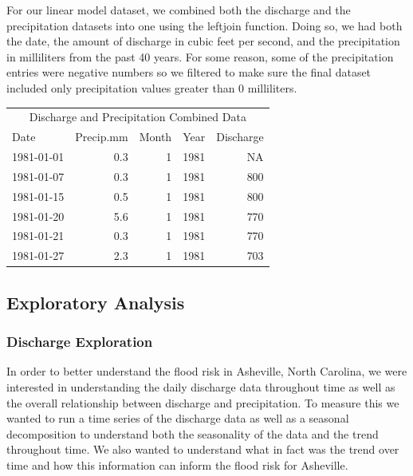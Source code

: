 \documentclass[
]{article}
\begin{document}
For our linear model dataset, we combined both the discharge and the
precipitation datasets into one using the leftjoin function. Doing so,
we had both the date, the amount of discharge in cubic feet per second,
and the precipitation in milliliters from the past 40 years. For some
reason, some of the precipitation entries were negative numbers so we
filtered to make sure the final dataset included only precipitation
values greater than 0 milliliters.

\begin{table}
\centering
\begin{tabular}[t]{l|r|r|r|r}
\hline
\multicolumn{5}{c}{Discharge and Precipitation Combined Data} \\
\cline{1-5}
Date & Precip.mm & Month & Year & Discharge\\
\hline
1981-01-01 & 0.3 & 1 & 1981 & NA\\
\hline
1981-01-07 & 0.3 & 1 & 1981 & 800\\
\hline
1981-01-15 & 0.5 & 1 & 1981 & 800\\
\hline
1981-01-20 & 5.6 & 1 & 1981 & 770\\
\hline
1981-01-21 & 0.3 & 1 & 1981 & 770\\
\hline
1981-01-27 & 2.3 & 1 & 1981 & 703\\
\hline
\end{tabular}
\end{table}

\newpage

\hypertarget{exploratory-analysis}{%
\subsection{\texorpdfstring{\textbf{Exploratory
Analysis}}{Exploratory Analysis}}\label{exploratory-analysis}}

\hypertarget{discharge-exploration}{%
\subsubsection{\texorpdfstring{\textbf{Discharge
Exploration}}{Discharge Exploration}}\label{discharge-exploration}}

In order to better understand the flood risk in Asheville, North
Carolina, we were interested in understanding the daily discharge data
throughout time as well as the overall relationship between discharge
and precipitation. To measure this we wanted to run a time series of the
discharge data as well as a seasonal decomposition to understand both
the seasonality of the data and the trend throughout time. We also
wanted to understand what in fact was the trend over time and how this
information can inform the flood risk for Asheville.
\end{document}
